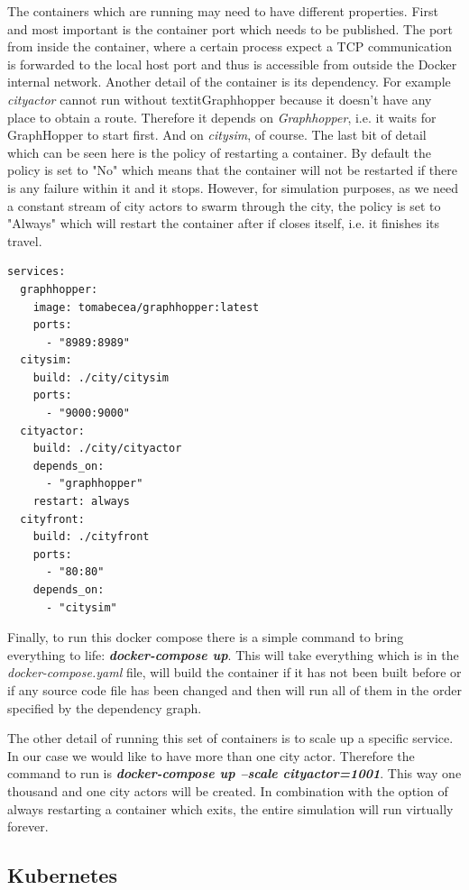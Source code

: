 \documentclass[conference]{IEEEtran}
\begin{document}
The containers which are running may need to have different properties. First and most important is the container port which needs to be published. The port from inside the container, where a certain process expect a TCP communication is forwarded to the local host port and thus is accessible from outside the Docker internal network. Another detail of the container is its dependency. For example \textit{cityactor} cannot run without textit{Graphhopper} because it doesn't have any place to obtain a route. Therefore it depends on \textit{Graphhopper}, i.e. it waits for GraphHopper to start first. And on \textit{citysim}, of course. The last bit of detail which can be seen here is the policy of restarting a container. By default the policy is set to "No" which means that the container will not be restarted if there is any failure within it and it stops. However, for simulation purposes, as we need a constant stream of city actors to swarm through the city, the policy is set to "Always" which will restart the container after if closes itself, i.e. it finishes its travel.

\begin{lstlisting}[caption=Docker-compose file, label=lst:dockercompose]
services:
  graphhopper:
    image: tomabecea/graphhopper:latest
    ports:
      - "8989:8989"
  citysim:
    build: ./city/citysim
    ports:
      - "9000:9000"
  cityactor:
    build: ./city/cityactor
    depends_on: 
      - "graphhopper"
    restart: always
  cityfront:
    build: ./cityfront
    ports:
      - "80:80"
    depends_on:
      - "citysim"
\end{lstlisting}

Finally, to run this docker compose there is a simple command to bring everything to life: \textit{\textbf{docker-compose up}}. This will take everything which is in the \textit{docker-compose.yaml} file, will build the container if it has not been built before or if any source code file has been changed and then will run all of them in the order specified by the dependency graph.

The other detail of running this set of containers is to scale up a specific service. In our case we would like to have more than one city actor. Therefore the command to run is \textit{\textbf{docker-compose up --scale cityactor=1001}}. This way one thousand and one city actors will be created. In combination with the option of always restarting a container which exits, the entire simulation will run virtually forever.

\subsection{Kubernetes}
\label{subsec:kubernetes}
\end{document}
